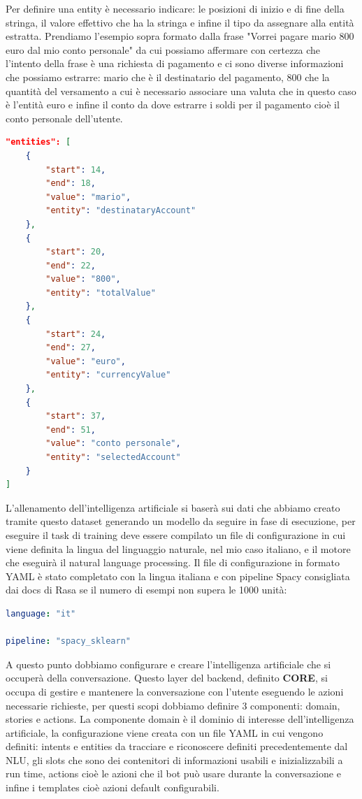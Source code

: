 Per definire una entity è necessario indicare: le posizioni di inizio e di fine della stringa, il valore effettivo che ha la stringa e infine il tipo da assegnare alla entità estratta.
Prendiamo l'esempio sopra formato dalla frase "Vorrei pagare mario 800 euro dal mio conto personale" da cui possiamo affermare con certezza che l'intento della frase è una richiesta di pagamento e ci sono diverse informazioni che possiamo estrarre: mario che è il destinatario del pagamento, 800 che la quantità del versamento a cui è necessario associare una valuta che in questo caso è l'entità euro e infine il conto da dove estrarre i soldi per il pagamento cioè il conto personale dell'utente.
\begin{lstlisting}[language=json,firstnumber=1]
"entities": [
    {
        "start": 14,
        "end": 18,
        "value": "mario",
        "entity": "destinataryAccount"
    },
    {
        "start": 20,
        "end": 22,
        "value": "800",
        "entity": "totalValue"
    },
    {
        "start": 24,
        "end": 27,
        "value": "euro",
        "entity": "currencyValue"
    },
    {
        "start": 37,
        "end": 51,
        "value": "conto personale",
        "entity": "selectedAccount"
    }
]
\end{lstlisting}
L'allenamento dell'intelligenza artificiale si baserà sui dati che abbiamo creato tramite questo dataset generando un modello da seguire in fase di esecuzione, per eseguire il task di training deve essere compilato un file di configurazione in cui viene definita la lingua del linguaggio naturale, nel mio caso italiano, e il motore che eseguirà il natural language processing.
Il file di configurazione in formato YAML è stato completato con la lingua italiana e con pipeline Spacy consigliata dai docs di Rasa se il numero di esempi non supera le 1000 unità:
\begin{lstlisting}[language=yaml]
language: "it"

pipeline: "spacy_sklearn"
\end{lstlisting}
A questo punto dobbiamo configurare e creare l'intelligenza artificiale che si occuperà della conversazione. 
Questo layer del backend, definito \textbf{CORE}, si occupa di gestire e mantenere la conversazione con l'utente eseguendo le azioni necessarie richieste, per questi scopi dobbiamo definire 3 componenti: domain, stories e actions.
La componente domain è il dominio di interesse dell'intelligenza artificiale, la configurazione viene creata con un file YAML in cui vengono definiti: intents e entities da tracciare e riconoscere definiti precedentemente dal NLU, gli slots che sono dei contenitori di informazioni usabili e inizializzabili a run time, actions cioè le azioni che il bot può usare durante la conversazione e infine i templates cioè azioni default configurabili.

